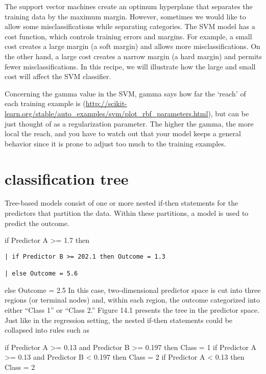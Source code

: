 \documentclass[
]{report}
\begin{document}
The support vector machines create an optimum hyperplane that separates the training data by the maximum margin. However, sometimes we would like to allow some misclassifications while separating categories. The SVM model has a cost function, which controls training errors and margins. For example, a small cost creates a large margin (a soft margin) and allows more misclassifications. On the other hand, a large cost creates a narrow margin (a hard margin) and permits fewer misclassifications. In this recipe, we will illustrate how the large and small cost will affect the SVM classifier.

Concerning the gamma value in the SVM, gamma says how far the `reach' of each training example is (\url{http://scikit-learn.org/stable/auto_examples/svm/plot_rbf_parameters.html}), but can be just thought of as a regularization parameter. The higher the gamma, the more local the reach, and you have to watch out that your model keeps a general behavior since it is prone to adjust too much to the training examples.

\hypertarget{classification-tree}{%
\section{classification tree}\label{classification-tree}}

Tree-based models consist of one or more nested if-then statements for the predictors that partition the data. Within these partitions, a model is used to predict the outcome.

if Predictor A \textgreater= 1.7 then

\begin{verbatim}
| if Predictor B >= 202.1 then Outcome = 1.3

| else Outcome = 5.6
\end{verbatim}

else Outcome = 2.5
In this case, two-dimensional predictor space is cut into three regions (or terminal nodes) and, within each region, the outcome categorized into either ``Class 1'' or ``Class 2.'' Figure 14.1 presents the tree in the predictor space. Just like in the regression setting, the nested if-then statements could be collapsed into rules such as

if Predictor A \textgreater= 0.13 and Predictor B \textgreater= 0.197 then Class = 1
if Predictor A \textgreater= 0.13 and Predictor B \textless{} 0.197 then Class = 2
if Predictor A \textless{} 0.13 then Class = 2
\end{document}
